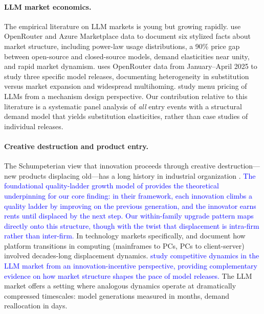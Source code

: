 \documentclass[11pt, a4paper]{article}
\begin{document}
\paragraph{LLM market economics.} The empirical literature on LLM markets is young but growing rapidly. \citet{demirer2025emerging} use OpenRouter and Azure Marketplace data to document six stylized facts about market structure, including power-law usage distributions, a 90\% price gap between open-source and closed-source models, demand elasticities near unity, and rapid market dynamism. \citet{fradkin2025demand} uses OpenRouter data from January--April 2025 to study three specific model releases, documenting heterogeneity in substitution versus market expansion and widespread multihoming. \citet{chenRoskillWilliams2025menu} study menu pricing of LLMs from a mechanism design perspective. Our contribution relative to this literature is a systematic panel analysis of \emph{all} entry events with a structural demand model that yields substitution elasticities, rather than case studies of individual releases.

\paragraph{Creative destruction and product entry.} The Schumpeterian view that innovation proceeds through creative destruction---new products displacing old---has a long history in industrial organization \citep{arrow1962economic, reinganum1983uncertain, grossman1991innovation, aghion2005competition}. \textcolor{blue}{The foundational quality-ladder growth model of \citet{aghion1992model} provides the theoretical underpinning for our core finding: in their framework, each innovation climbs a quality ladder by improving on the previous generation, and the innovator earns rents until displaced by the next step. Our within-family upgrade pattern maps directly onto this structure, though with the twist that displacement is intra-firm rather than inter-firm.} In technology markets specifically, \citet{bresnahan1999technological} and \citet{bresnahan2011schumpeterian} document how platform transitions in computing (mainframes to PCs, PCs to client-server) involved decades-long displacement dynamics. \textcolor{blue}{\citet{zheng2024competition} study competitive dynamics in the LLM market from an innovation-incentive perspective, providing complementary evidence on how market structure shapes the pace of model releases.} The LLM market offers a setting where analogous dynamics operate at dramatically compressed timescales: model generations measured in months, demand reallocation in days.
\end{document}
